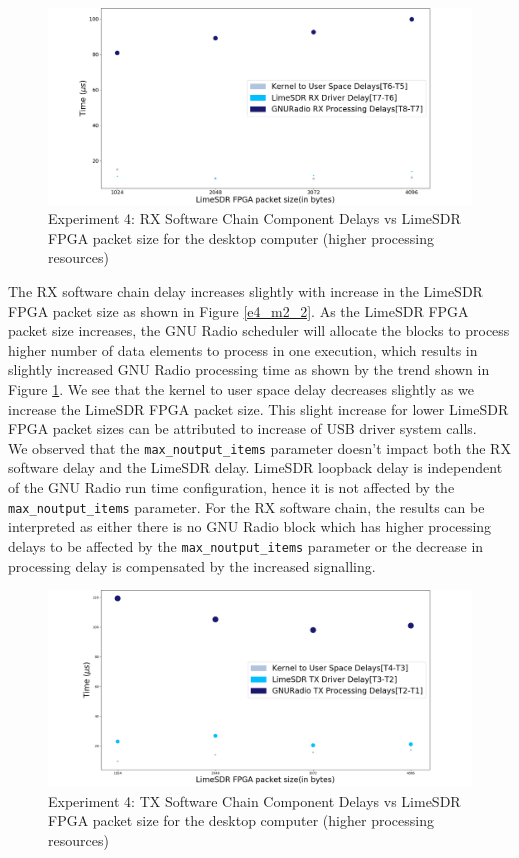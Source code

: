 \begin{figure}[h!]
\centering
\includegraphics[width=\textwidth]{Thesis/Figure/E4M2-3.png}
\caption{Experiment 4: RX Software Chain Component Delays vs LimeSDR FPGA packet size for the desktop computer (higher processing resources)}
\label{e4_m2_3}
\end{figure}

The RX software chain delay increases slightly with increase in the LimeSDR FPGA packet size as shown in Figure \ref{e4_m2_2}.
As the LimeSDR FPGA packet size increases, the GNU Radio scheduler will allocate the blocks to process higher number of data elements to process in one execution, which results in slightly increased GNU Radio processing time as shown by the trend shown in Figure \ref{e4_m2_3}.
We see that the kernel to user space delay decreases slightly as we increase the LimeSDR FPGA packet size.
This slight increase for lower LimeSDR FPGA packet sizes can be attributed to increase of USB driver system calls.\\

We observed that the \texttt{max\_noutput\_items} parameter doesn't impact both the RX software delay and the LimeSDR delay.
LimeSDR loopback delay is independent of the GNU Radio run time configuration, hence it is not affected by the \texttt{max\_noutput\_items} parameter.
For the RX software chain, the results can be interpreted as either there is no GNU Radio block which has higher processing delays to be affected by the \texttt{max\_noutput\_items} parameter or the decrease in processing delay is compensated by the increased signalling.\\

\begin{figure}[h!]
\centering
\includegraphics[width=\textwidth]{Thesis/Figure/E4M2-4.png}
\caption{Experiment 4: TX Software Chain Component Delays vs LimeSDR FPGA packet size for the desktop computer (higher processing resources)}
\label{e4_m2_4}
\end{figure}

